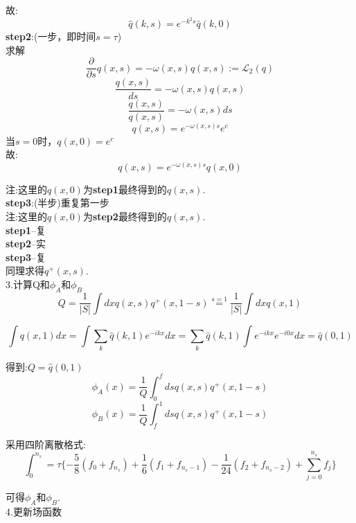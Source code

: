 \documentclass[12pt]{article}
\begin{document}
\begin{CJK}{UTF8}{gkai}
     故:
     $$\hat{q}(k,s)=e^{-k^2s}\hat{q}(k,0)$$
     \textbf{step2}:(一步，即时间$s=\tau$)\\
     
     求解$$\frac{\partial}{\partial s}q(x,s)=-\omega(x,s)q(x,s)  :=\mathcal{L}_2(q)$$
     $$\dfrac{q(x,s)}{ds}=-\omega(x,s)q(x,s)$$
     $$\dfrac{q(x,s)}{q(x,s)}=-\omega(x,s)ds$$
     $$q(x,s)=e^{-\omega(x,s)s}e^c$$
     当$s=0$时，$q(x,0)= e^{c} $\\
     故:
     $$q(x,s)=e^{-\omega(x,s)s}q(x,0)$$
     
     注:这里的$q(x,0)$为\textbf{step1}最终得到的$q(x,s)$.\\ 
     \textbf{step3}:(半步)重复第一步\\
     
      注:这里的$q(x,0)$为\textbf{step2}最终得到的$q(x,s)$.\\
      
    \textbf{step1}--复\\
    
    \textbf{step2}--实\\
    
    \textbf{step3}--复\\
     
     同理求得$q^+(x,s)$.\\
     
     3.计算Q和$\phi_A$和$\phi_B$\\
     
      $$Q=\frac{1}{|S|}\int dx q(x,s)q^{+}(x,1-s)
      \overset{s=1}{=}\frac{1}{|S|}\int dx q(x,1)$$
      
      $$\int q(x,1) dx=\int\sum_{k}\hat{q}(k,1)e^{-ikx}dx=\sum_{k}\hat{q}(k,1)\int e^{-ikx}e^{-i0x}dx=\hat{q}(0,1)$$
      
      
     得到:$Q=\hat{q}(0,1)$\\
     
      $$\phi _A(x)=\frac{1}{Q}\int_0^f ds q(x,s)q^{+}(x,1-s)$$
      $$\phi _B(x)=\frac{1}{Q}\int_f^1 ds q(x,s)q^{+}(x,1-s)$$
      
      采用四阶离散格式:\\
      
      $$\int_{0}^{n_s}=\tau \{-\frac{5}{8}(f_0+f_{n_s})+\frac{1}{6}(f_1+f_{n_s-1})-\frac{1}{24}(f_2+f_{n_s-2})+\sum_{j=0}^{n_s}f_j\}$$
      
     可得$\phi_A$和$\phi_B$.\\
     
     4.更新场函数\\
     

\end{CJK}
\end{document}
